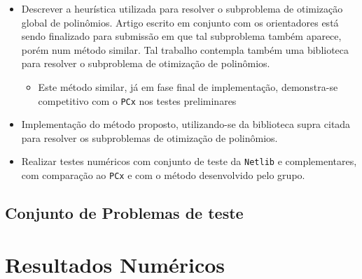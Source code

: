 \begin{itemize}
\item Descrever a heurística utilizada para resolver o subproblema de otimização
global de polinômios. Artigo escrito em conjunto com os orientadores está sendo
finalizado para submissão em que tal subproblema também aparece, porém num
método similar. Tal trabalho contempla também uma biblioteca para resolver o
subproblema de otimização de polinômios.
\begin{itemize}
  \item Este método similar, já em fase final de implementação,
  demonstra-se competitivo com o \texttt{PCx} nos testes preliminares
 \end{itemize}
\item Implementação do método proposto, utilizando-se da biblioteca supra
citada para resolver os subproblemas de otimização de polinômios.
\item Realizar  testes
numéricos com conjunto de teste da \texttt{Netlib} e complementares, com
comparação ao \texttt{PCx} e com o método desenvolvido pelo grupo.
\end{itemize}



\subsection{Conjunto de Problemas de teste}

\section{Resultados Numéricos}